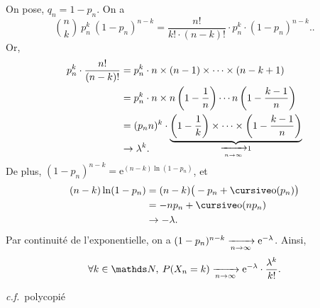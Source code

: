 \begin{prv}
  On pose, $q_n = 1 - p_n$. On a 
  \[
    {n\choose k}\:p_n^k\:(1-p_n)^{n-k} = \frac{n!}{k!\cdot (n-k)!} \cdot  p_n^k \cdot (1-p_n)^{n-k}.
  .\] 
  Or,
  \begin{align*}
    p_n^k \cdot \frac{n!}{(n-k)!} &= p_n^k\cdot n \times (n-1) \times \cdots \times (n-k+1)\\
    &= p_n^k\cdot n \times n\left( 1 - \frac{1}{n} \right)\cdots n\left( 1 - \frac{k-1}{n} \right) \\
    &= (p_n n)^k \cdot \underbrace{\left( 1 - \frac{1}{k} \right) \times \cdots \times \left( 1 - \frac{k-1}{n} \right)}_{\xrightarrow[n\to \infty]{} 1} \\[-0.7cm]
    &\to \lambda^k.
  \end{align*}
  De plus, $(1-p_n)^{n-k} = \mathrm{e}^{(n-k) \ln(1 - p_n)}$, et
  \begin{align*}
    (n-k) \ln(1 - p_n) &= (n-k) \big(-p_n + \po(p_n)\big) \\
    &= -np_n + \po(n p_n) \\
    &\to -\lambda.
  \end{align*}
  Par continuité de l'exponentielle, on a $(1-p_n)^{n-k} \xrightarrow[n\to \infty]{} \mathrm{e}^{-\lambda}$. Ainsi, \[
    \forall k \in \N,\: P(X_n = k) \tendsto{n\to \infty} \mathrm{e}^{-\lambda} \cdot \frac{\lambda^k}{k!}
  .\] 
\end{prv}

\begin{rmk}
  \textit{c.f.}\ polycopié
\end{rmk}


